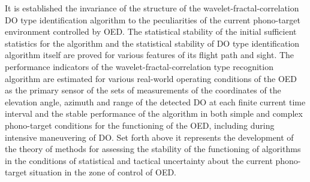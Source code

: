 It is established the invariance of the structure of the wavelet-fractal-correlation DO type identification algorithm to the peculiarities of the current phono-target environment controlled by OED.
The statistical stability of the initial sufficient statistics for the algorithm and the statistical stability of DO type identification algorithm itself are proved for various features of its flight path and sight.
The performance indicators of the wavelet-fractal-correlation type recognition algorithm are estimated for various real-world operating conditions of the OED as the primary sensor of the sets of measurements of the coordinates of the elevation angle, azimuth and range of the detected DO at each finite current time interval and the stable performance of the algorithm in both simple and complex phono-target conditions for the functioning of the OED, including during intensive maneuvering of DO.
Set forth above it represents the development of the theory of methods for assessing the stability of the functioning of algorithms in the conditions of statistical and tactical uncertainty about the current phono-target situation in the zone of control of OED.
